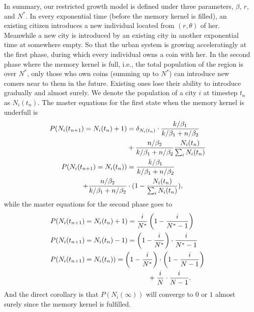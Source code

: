 \documentclass[reprint,unsortedaddress,amsmath,amssymb,floatfix,aps,prl,showkeys]{revtex4-2}
\begin{document}
In summary, our restricted growth model is defined under three parameters, $\beta$, $r$, and $N^*$. In every exponential time (before the memory kernel is filled), an existing citizen introduces a new individual located from $(r,\theta)$ of her. Meanwhile a new city is introduced by an existing city in another exponential time at somewhere empty. So that the urban system is growing acceleratingly at the first phase, during which every individual owns a coin with her. In the second phase where the memory kernel is full, i.e., the total population of the region is over $N^*$, only those who own coins (summing up to $N^*$) can introduce new comers near to them in the future. Existing ones lose their ability to introduce gradually and almost surely. We denote the population of a city $i$ at timestep $t_n$ as $N_i(t_n)$. The master equations for the first state when the memory kernel is underfull is 
\begin{align}
    P(N_i(t_{n+1}) = N_i(t_{n})+1) &= \delta_{N_i(t_n)}\cdot\frac{k/\beta_1}{k/\beta_1 + n/\beta_2}\notag \\ &+ \frac{n/\beta_2}{k/\beta_1 + n/\beta_2}\frac{N_i(t_{n})}{\sum_i N_i(t_{n})} \notag \\
    P(N_i(t_{n+1}) = N_i(t_{n})) &= \frac{k/\beta_1}{k/\beta_1 + n/\beta_2}\notag \\ + \frac{n/\beta_2}{k/\beta_1 + n/\beta_2}&\cdot (1-\frac{N_i(t_{n})}{\sum_i N_i(t_{n})}),
\end{align}
while the master equations for the second phase goes to\begin{align}
    &P(N_i(t_{n+1}) = N_i(t_{n})+1)=\frac{i}{N^*}\left(1-\frac{i}{N^*-1}\right)\notag\\
    & P(N_i(t_{n+1}) = N_i(t_{n})-1)=\left(1-\frac{i}{N^*}\right) \cdot \frac{i}{N^*-1}\notag\\
    & P(N_i(t_{n+1}) = N_i(t_{n}))=\left(1-\frac{i}{N^*}\right) \cdot\left(1-\frac{i}{N-1}\right) \notag\\ &\hspace{5cm}+ \frac{i}{N}\cdot\frac{i}{N-1}.
\end{align}
And the direct corollary is that $P(N_i(\infty))$ will converge to $0$ or $1$ almost surely since the memory kernel is fulfilled. 

\end{document}
